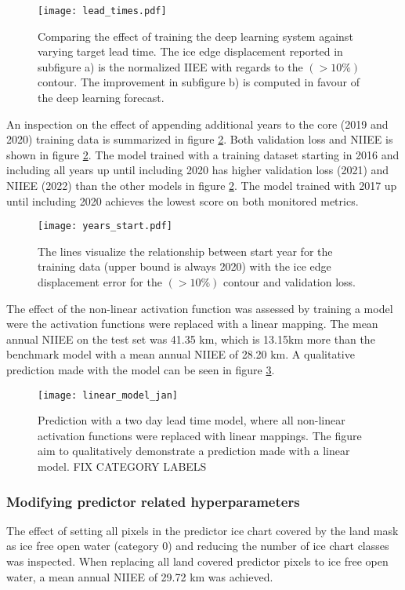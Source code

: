 \documentclass[../main/thesis]{subfiles}
\begin{document}
\begin{figure}
    \centering
    \texttt{[image: lead\_times.pdf]}
    \caption{\label{fig:lead_times}Comparing the effect of training the deep learning system against varying target lead time. The ice edge displacement reported in subfigure a) is the normalized IIEE with regards to the $(> 10\%)$ contour. The improvement in subfigure b) is computed in favour of the deep learning forecast.}
\end{figure}

An inspection on the effect of appending additional years to the core (2019 and 2020) training data is summarized in figure \ref{fig:append_years}. Both validation loss and NIIEE is shown in figure \ref{fig:append_years}. The model trained with a training dataset starting in 2016 and including all years up until including 2020 has higher validation loss (2021) and NIIEE (2022) than the other models in figure \ref{fig:append_years}. The model trained with 2017 up until including 2020 achieves the lowest score on both monitored metrics.

\begin{figure}
    \centering
    \texttt{[image: years\_start.pdf]}
    \caption{\label{fig:append_years}The lines visualize the relationship between start year for the training data (upper bound is always 2020) with the ice edge displacement error for the $(> 10\%)$ contour and validation loss.}
\end{figure}

The effect of the non-linear activation function was assessed by training a model were the activation functions were replaced with a linear mapping. The mean annual NIIEE on the test set was 41.35 km, which is 13.15km more than the benchmark model with a mean annual NIIEE of 28.20 km. A qualitative prediction made with the model can be seen in figure \ref{fig:linear_model}. 

\begin{figure}
    \centering
    \texttt{[image: linear\_model\_jan]}
    \caption{\label{fig:linear_model}Prediction with a two day lead time model, where all non-linear activation functions were replaced with linear mappings. The figure aim to qualitatively demonstrate a prediction made with a linear model. FIX CATEGORY LABELS}
\end{figure}

\subsubsection{Modifying predictor related hyperparameters}
The effect of setting all pixels in the predictor ice chart covered by the land mask as ice free open water (category 0) and reducing the number of ice chart classes was inspected. When replacing all land covered predictor pixels to ice free open water, a mean annual NIIEE of 29.72 km was achieved. 
\end{document}
